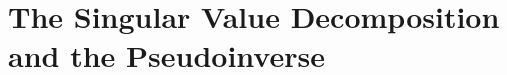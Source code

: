 \setcounter{section}{6}
\section{The Singular Value Decomposition and the Pseudoinverse}



\vspace{12pt}



\vspace{12pt}









